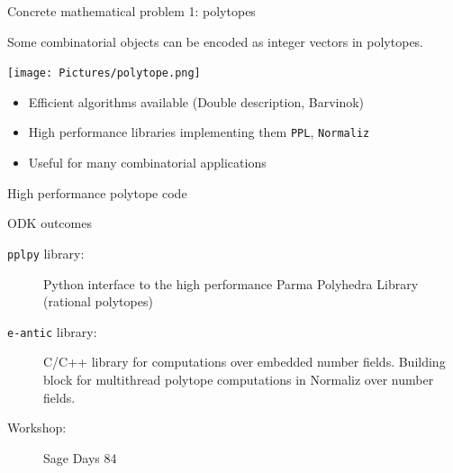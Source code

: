 \documentclass{beamer}
\begin{document}

\begin{frame}{Concrete mathematical problem 1: polytopes}
  \begin{example}
  Some combinatorial objects can be encoded as integer vectors in polytopes.
  \begin{center}\texttt{[image: Pictures/polytope.png]}\end{center}
  \end{example}

   \begin{itemize}
   \item Efficient algorithms available (Double description, Barvinok)
   \item High performance libraries implementing them \texttt{PPL}, \texttt{Normaliz}
   \item Useful for many combinatorial applications
   \end{itemize}
\end{frame}

\begin{frame}{High performance polytope code}
  \begin{block}{ODK outcomes}
  \begin{description}
  \item[\texttt{pplpy} library:] Python interface to the high performance
  Parma Polyhedra Library (rational polytopes)
  \item[\texttt{e-antic} library:] C/C++ library for computations over embedded
  number fields. Building block for multithread polytope computations in Normaliz
  over number fields.
  \item[Workshop:] Sage Days 84
  \end{description}
  \end{block}

\end{frame}
\end{document}
